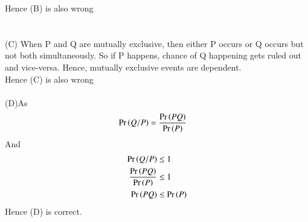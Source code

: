 \documentclass[journal,12pt,twocolumn]{IEEEtran}
\begin{document}
	Hence (B) is also wrong \\ \\  \\
	(C) When P and Q are mutually exclusive, then either P occurs or Q occurs but not both simultaneously. So if P happens, chance of Q happening gets ruled out and vice-versa. Hence, mutually exclusive events are dependent.\\Hence (C) is also wrong\\ \\
	(D)As \begin{align}
		\Pr\left(Q/P\right) &= \frac{\Pr\left(P Q\right)}{\Pr\left(P\right)} 
	\end{align}
	And \begin{align}
		\Pr\left(Q/P\right) &\leq 1\\
		\frac{\Pr\left(P Q\right)}{\Pr\left(P\right)} &\leq 1\\ 
		\Pr\left(P Q\right) &\leq \Pr\left(P\right)
	\end{align}
	Hence (D) is correct.
	
	
	
	
	
\end{document}
